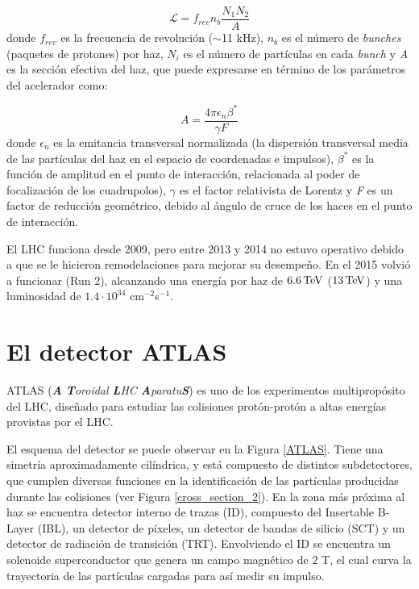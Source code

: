 \begin{equation}
\mathcal{L}=f_{rev}n_{b}\frac{N_{1}N_{2}}{A}
\end{equation}
donde $f_{rev}$ es la frecuencia de revolución ($\sim$11 kHz), $n_{b}$ es el número de \textit{bunches} (paquetes de protones) por haz, $N_{i}$ es el número de partículas en cada \textit{bunch} y \textit{A} es la sección efectiva del haz, que puede expresarse en término de los parámetros del acelerador como:

\begin{equation}
A=\frac{4 \pi \epsilon_{n}\beta^{*}}{\gamma F}
\end{equation}
donde $\epsilon_{n}$ es la emitancia transversal normalizada (la dispersión transversal media de las partículas del  haz en el espacio de coordenadas e impulsos), $\beta^{*}$ es la función de amplitud en el punto de interacción, relacionada al poder de focalización de los cuadrupolos), $\gamma$ es el factor relativista de Lorentz y \textit{F} es un factor de reducción geométrico, debido al ángulo de cruce de los haces en el punto de interacción.


El LHC funciona desde 2009, pero entre 2013 y 2014 no estuvo operativo debido a que se le hicieron remodelaciones para mejorar su desempeño. En el 2015 volvió a funcionar (Run 2), alcanzando una energía por haz de $6.6 \, \mathrm{TeV}$ ($13 \, \mathrm{TeV}$) y una luminosidad de $1.4\cdot 10^{34}$ cm$^{-2}$s$^{-1}$.

\section{El detector ATLAS}

ATLAS (\textit{\textbf{A} \textbf{T}oroidal \textbf{L}HC \textbf{A}paratu\textbf{S}})  \cite{PERF-2007-01} es uno de los experimentos multipropósito del LHC, diseñado para estudiar las colisiones protón-protón a altas energías provistas por el LHC.

El esquema del detector se puede observar en la Figura \ref{ATLAS}. Tiene una simetría aproximadamente cilíndrica, y está compuesto de distintos subdetectores, que cumplen diversas funciones en la identificación de las partículas producidas durante las colisiones (ver Figura \ref{cross_section_2}). En la zona más próxima al haz se encuentra detector interno de trazas (ID), compuesto del Insertable B-Layer (IBL), un detector de píxeles, un detector de bandas de silicio (SCT) y un detector de radiación de transición (TRT). Envolviendo el ID se encuentra un solenoide superconductor que genera un campo magnético de $2$ T, el cual curva la trayectoria de las partículas cargadas para así medir su impulso.

